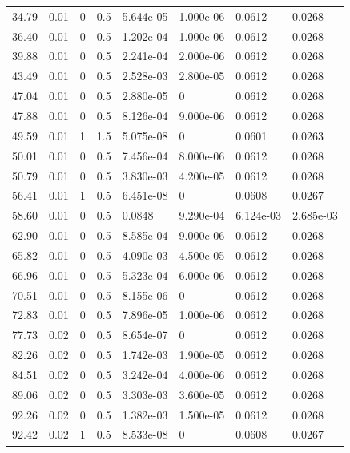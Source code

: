 \documentclass[preview]{standalone}
\begin{document}
{{\begin{tabular}{L{1.2cm}C{1.2cm} C{0.3cm}C{0.5cm} C{1.4cm}C{1.4cm} C{1.4cm}C{1.4cm}}
  34.79  &  0.01  & 0     & 0.5 &  5.644e-05  & 1.000e-06  & 0.0612 &  0.0268   \\ 
  36.40  &  0.01  & 0     & 0.5 &  1.202e-04  & 1.000e-06  & 0.0612 &  0.0268   \\ 
  39.88  &  0.01  & 0     & 0.5 &  2.241e-04  & 2.000e-06  & 0.0612 &  0.0268   \\ 
  43.49  &  0.01  & 0     & 0.5 &  2.528e-03  & 2.800e-05  & 0.0612 &  0.0268   \\ 
  47.04  &  0.01  & 0     & 0.5 &  2.880e-05  & 0  & 0.0612 &  0.0268   \\ 
  47.88  &  0.01  & 0     & 0.5 &  8.126e-04  & 9.000e-06  & 0.0612 &  0.0268   \\ 
  49.59  &  0.01  & 1     & 1.5 &  5.075e-08  & 0  & 0.0601 &  0.0263   \\ 
  50.01  &  0.01  & 0     & 0.5 &  7.456e-04  & 8.000e-06  & 0.0612 &  0.0268   \\ 
  50.79  &  0.01  & 0     & 0.5 &  3.830e-03  & 4.200e-05  & 0.0612 &  0.0268   \\ 
  56.41  &  0.01  & 1     & 0.5 &  6.451e-08  & 0  & 0.0608 &  0.0267   \\ 
  58.60  &  0.01  & 0     & 0.5 &  0.0848  & 9.290e-04  & 6.124e-03 &  2.685e-03   \\ 
  62.90  &  0.01  & 0     & 0.5 &  8.585e-04  & 9.000e-06  & 0.0612 &  0.0268   \\ 
  65.82  &  0.01  & 0     & 0.5 &  4.090e-03  & 4.500e-05  & 0.0612 &  0.0268   \\ 
  66.96  &  0.01  & 0     & 0.5 &  5.323e-04  & 6.000e-06  & 0.0612 &  0.0268   \\ 
  70.51  &  0.01  & 0     & 0.5 &  8.155e-06  & 0  & 0.0612 &  0.0268   \\ 
  72.83  &  0.01  & 0     & 0.5 &  7.896e-05  & 1.000e-06  & 0.0612 &  0.0268   \\ 
  77.73  &  0.02  & 0     & 0.5 &  8.654e-07  & 0  & 0.0612 &  0.0268   \\ 
  82.26  &  0.02  & 0     & 0.5 &  1.742e-03  & 1.900e-05  & 0.0612 &  0.0268   \\ 
  84.51  &  0.02  & 0     & 0.5 &  3.242e-04  & 4.000e-06  & 0.0612 &  0.0268   \\ 
  89.06  &  0.02  & 0     & 0.5 &  3.303e-03  & 3.600e-05  & 0.0612 &  0.0268   \\ 
  92.26  &  0.02  & 0     & 0.5 &  1.382e-03  & 1.500e-05  & 0.0612 &  0.0268   \\ 
  92.42  &  0.02  & 1     & 0.5 &  8.533e-08  & 0  & 0.0608 &  0.0267   \\ 

\end{tabular}}}
\end{document}
